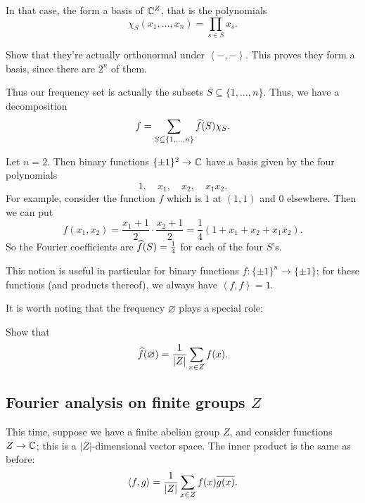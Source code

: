 In that case, the  form a basis of $\mathbb C^Z$,
that is the polynomials
\[ \chi_S(x_1, \dots, x_n) = \prod_{s \in S} x_s. \]
\begin{exercise}
	Show that they're actually orthonormal under $\left< -,-\right>$.
	This proves they form a basis, since there are $2^n$ of them.
\end{exercise}
Thus our frequency set is actually the subsets $S \subseteq \{1, \dots, n\}$.
Thus, we have a decomposition
\[ f = \sum_{S \subseteq \{1, \dots, n\}} \widehat f(S) \chi_S. \]
\begin{example}
	Let $n = 2$.
	Then binary functions $\{ \pm 1\}^2 \to \mathbb C$ have a basis
	given by the four polynomials
	\[ 1, \quad x_1, \quad x_2, \quad x_1x_2. \]
	For example, consider the function $f$
	which is $1$ at $(1,1)$ and $0$ elsewhere.
	Then we can put
	\[ f(x_1, x_2) = \frac{x_1+1}{2} \cdot \frac{x_2+1}{2}
		= \frac14 \left( 1 + x_1 + x_2 + x_1x_2 \right). \]
	So the Fourier coefficients are $\widehat f(S) = \frac 14$
	for each of the four $S$'s.
\end{example}
This notion is useful in particular for
binary functions $f \colon \{\pm1\}^n \to \{\pm1\}$;
for these functions (and products thereof),
we always have $\left< f,f \right> = 1$.

It is worth noting that the frequency $\varnothing$ plays a special role:
\begin{exercise}
	Show that
	\[ \widehat f(\varnothing) = \frac{1}{|Z|} \sum_{x \in Z} f(x). \]
\end{exercise}

\subsection{Fourier analysis on finite groups $Z$}
This time, suppose we have a finite abelian group $Z$,
and consider functions $Z \to \mathbb C$;
this is a $|Z|$-dimensional vector space.
The inner product is the same as before:
\[ \left< f,g \right> = \frac{1}{|Z|} \sum_{x \in Z} f(x) \overline{g(x)}. \]

